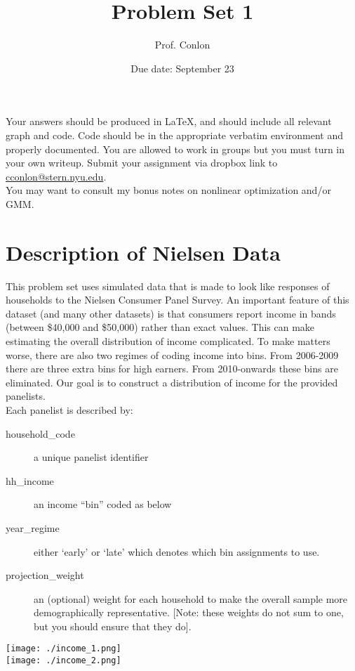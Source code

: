 \documentclass{article}
\title{Problem Set 1}
\begin{document}
\small
\date{Due date: September 23}
\author{Prof. Conlon}
\maketitle
Your answers should be produced in \LaTeX, and should include all relevant graph and code.  Code should be in the appropriate verbatim environment and properly documented. You are allowed to work in groups but you must turn in your own writeup. Submit your assignment via dropbox link to \href{mailto:cconlon@stern.nyu.edu}{cconlon@stern.nyu.edu}.\\

You may want to consult my bonus notes on nonlinear optimization and/or GMM.

\section*{\normalsize Description of Nielsen Data}
This problem set uses simulated data that is made to look like responses of households to the Nielsen Consumer Panel Survey. An important feature of this dataset (and many other datasets) is that consumers report income in bands (between \$40,000 and \$50,000) rather than exact values. This can make estimating the overall distribution of income complicated. To make matters worse, there are also two regimes of coding income into bins. From 2006-2009 there are three extra bins for high earners. From 2010-onwards these bins are eliminated. Our goal is to construct a distribution of income for the provided panelists.\\

\noindent Each panelist is described by:
\begin{description}
\item[household\_code] a unique panelist identifier
\item[hh\_income] an income ``bin'' coded as below
\item[year\_regime] either `early' or `late' which denotes which bin assignments to use.
\item[projection\_weight] an (optional) weight for each household to make the overall sample more demographically representative. [Note: these weights do not sum to one, but you should ensure that they do].
\end{description}

\begin{center}
\texttt{[image: ./income\_1.png]}\\
\texttt{[image: ./income\_2.png]}
\end{center}
\end{document}
